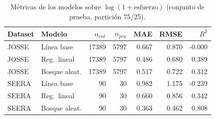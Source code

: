 \begin{table}[t]
\centering
\caption{M\'etricas de los modelos sobre $\log(1+\text{esfuerzo})$ (conjunto de prueba, partici\'on 75/25).}
\label{tab:metricas}
\scriptsize
\setlength{\tabcolsep}{3.5pt}
\begin{tabular}{llrrrrr}
\toprule
Dataset & Modelo & $n_{ent}$ & $n_{pru}$ & MAE & RMSE & $R^2$ \\
\midrule
JOSSE & L\'inea base & 17389 & 5797 & 0.667 & 0.870 & -0.000 \\
JOSSE & Reg.\ lineal & 17389 & 5797 & 0.486 & 0.680 & 0.389 \\
JOSSE & Bosque aleat. & 17389 & 5797 & 0.517 & 0.722 & 0.312 \\
SEERA & L\'inea base & 90 & 30 & 0.982 & 1.175 & -0.239 \\
SEERA & Reg.\ lineal & 90 & 30 & 0.660 & 0.856 & 0.342 \\
SEERA & Bosque aleat. & 90 & 30 & 0.363 & 0.462 & 0.808 \\
\bottomrule
\end{tabular}
\end{table}
